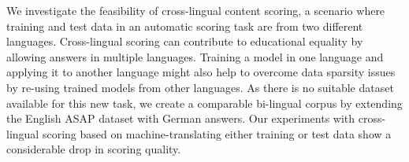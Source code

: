 We investigate the feasibility of cross-lingual content scoring, a scenario where training and test data in an automatic scoring task are from two different languages. Cross-lingual scoring can contribute to educational equality by allowing answers in multiple languages. Training a model in one language and applying it to another language might also help to overcome data sparsity issues by re-using trained models from other languages. As there is no suitable dataset available for this new task, we create a comparable bi-lingual corpus by extending the English ASAP dataset with German answers. Our experiments with cross-lingual scoring based on machine-translating either training or test data show a considerable drop in scoring quality.
